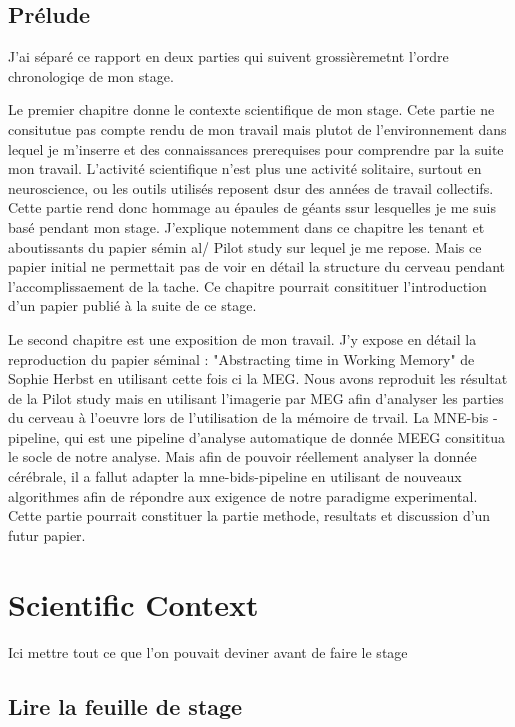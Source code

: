 \section{Prélude}

J'ai séparé ce rapport en deux parties qui suivent grossièremetnt l'ordre chronologiqe de mon stage.

Le premier chapitre donne le contexte scientifique de mon stage. Cete partie ne consitutue pas compte rendu de mon travail mais plutot de l'environnement dans lequel je m'inserre et des connaissances prerequises pour comprendre par la suite mon travail. L'activité scientifique n'est plus une activité solitaire, surtout en neuroscience, ou les outils utilisés reposent dsur des années de travail collectifs. Cette partie rend donc hommage au épaules de géants ssur lesquelles je me suis basé pendant mon stage. J'explique notemment dans ce chapitre les tenant et aboutissants du papier sémin al/ Pilot study sur lequel je me repose. Mais ce papier initial ne permettait pas de voir en détail la structure du cerveau pendant l'accomplissaement de la tache. Ce chapitre pourrait consitituer l'introduction d'un papier publié à la suite de ce stage.

Le second chapitre est une exposition de mon travail. J'y expose en détail la reproduction du papier séminal : "Abstracting time in Working Memory" de Sophie Herbst en utilisant cette fois ci la MEG. Nous avons reproduit les résultat de la Pilot study mais en utilisant l'imagerie par MEG afin d'analyser les parties du cerveau à l'oeuvre lors de l'utilisation de la mémoire de trvail. La MNE-bis -pipeline, qui est une pipeline d'analyse automatique de donnée MEEG consititua le socle de notre analyse. Mais afin de pouvoir réellement analyser la donnée cérébrale, il a fallut adapter la mne-bids-pipeline en utilisant de nouveaux algorithmes afin de répondre aux exigence de notre paradigme experimental. Cette partie pourrait constituer la partie methode, resultats et discussion d'un futur papier.


\chapter{Scientific Context}
Ici mettre tout ce que l'on pouvait deviner avant de faire le stage

\section{Lire la feuille de stage}

